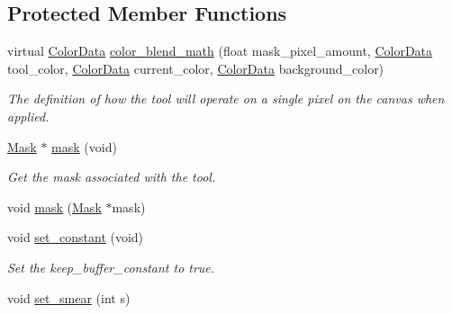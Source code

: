 \subsection*{Protected Member Functions}
\begin{DoxyCompactItemize}
\item 
virtual \hyperlink{classimage__tools_1_1ColorData}{Color\+Data} \hyperlink{classimage__tools_1_1Tool_adca00cc3d94a4ca7bdf15d323754e105}{color\+\_\+blend\+\_\+math} (float mask\+\_\+pixel\+\_\+amount, \hyperlink{classimage__tools_1_1ColorData}{Color\+Data} tool\+\_\+color, \hyperlink{classimage__tools_1_1ColorData}{Color\+Data} current\+\_\+color, \hyperlink{classimage__tools_1_1ColorData}{Color\+Data} background\+\_\+color)
\begin{DoxyCompactList}\small\item\em The definition of how the tool will operate on a single pixel on the canvas when applied. \end{DoxyCompactList}\item 
\hyperlink{classimage__tools_1_1Mask}{Mask} $\ast$ \hyperlink{classimage__tools_1_1Tool_a3002c5364aa984eec6e25a1c842dae2f}{mask} (void)
\begin{DoxyCompactList}\small\item\em Get the mask associated with the tool. \end{DoxyCompactList}\item 
void \hyperlink{classimage__tools_1_1Tool_a18145cb816dd3d56f87f4ddab7ce3ab3}{mask} (\hyperlink{classimage__tools_1_1Mask}{Mask} $\ast$mask)
\item 
void \hyperlink{classimage__tools_1_1Tool_ab3a25d0708b0c4cd36b9545a3c22531a}{set\+\_\+constant} (void)\hypertarget{classimage__tools_1_1Tool_ab3a25d0708b0c4cd36b9545a3c22531a}{}\label{classimage__tools_1_1Tool_ab3a25d0708b0c4cd36b9545a3c22531a}

\begin{DoxyCompactList}\small\item\em Set the keep\+\_\+buffer\+\_\+constant to true. \end{DoxyCompactList}\item 
void \hyperlink{classimage__tools_1_1Tool_a7a388418aa1df58f39347f07728db81a}{set\+\_\+smear} (int s)\hypertarget{classimage__tools_1_1Tool_a7a388418aa1df58f39347f07728db81a}{}\label{classimage__tools_1_1Tool_a7a388418aa1df58f39347f07728db81a}


\end{DoxyCompactItemize}

